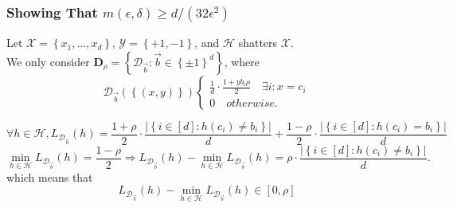 \subsubsection{Showing That $ m(\epsilon, \delta) \ge d/ (32\epsilon^2) $}%
\label{ssub:showing_that_m_epsilon_1_8_ge_8d_epsilon_2_}

Let $ \mathcal{X} = \left\{ x_1, \ldots, x_d \right\} $, $ \mathcal{Y} = \left\{ +1, -1 \right\} $, and $ \mathcal{H} $ shatters $ \mathcal{X} $. \\
We only consider $ \mathbf{D}_\rho = \left\{ \mathcal{D}_{\vec{b}} : \vec{b} \in {\left\{ \pm 1 \right\}}^d \right\} $, where
\[
    \mathcal{D}_{\vec{b}} (\left\{ (x,y) \right\})
    \begin{cases}
        \frac{1}{d} \cdot \frac{1+yb_i \rho}{2} \quad \exists i: x = c_i \\
        0 \quad otherwise.
    \end{cases}
\]

\[
    \forall h \in \mathcal{H}, L_{\mathcal{D}_{\vec{b}}}(h) = \frac{1+\rho}{2} \cdot \frac{\left| \left\{ i \in [d]: h(c_i) \ne b_i \right\} \right|}{d} + \frac{1-\rho}{2} \cdot \frac{\left| \left\{ i \in [d]: h(c_i) = b_i \right\} \right|}{d} 
\]
\[
    \min_{h \in \mathcal{H}} L_{\mathcal{D}_{\vec{b}}}(h) = \frac{1-\rho}{2} \Rightarrow
    L_{\mathcal{D}_{\vec{b}}}(h) - \min_{h \in \mathcal{H}} L_{\mathcal{D}_{\vec{b}}}(h)
    = \rho \cdot \frac{\left| \left\{ i \in [d]: h(c_i) \ne b_i \right\} \right|}{d}.
\]
which means that
\[
    L_{\mathcal{D}_{\vec{b}}}(h) - \min_{h \in \mathcal{H}} L_{\mathcal{D}_{\vec{b}}}(h) \in [0, \rho]
\]

